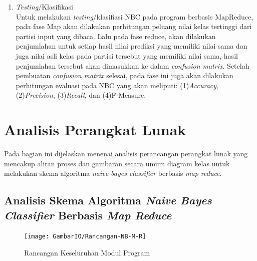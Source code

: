 \begin{enumerate}
	\item \textit{Testing}/Klasifikasi\\
	Untuk melakukan \textit{testing}/klasifiasi NBC pada program berbasis MapReduce, pada fase Map akan dilakukan perhitungan peluang nilai kelas tertinggi dari partisi input yang dibaca. Lalu pada fase reduce, akan dilakukan penjumlahan untuk setiap hasil nilai prediksi yang memiliki nilai sama dan juga nilai asli kelas pada partisi tersebut yang memiliki nilai sama, hasil penjumlahan tersebut akan dimasukkan ke dalam \textit{confusion matrix}. Setelah pembuatan \textit{confusion matrix} selesai, pada fase ini juga akan dilakukan perhitungan evaluasi pada NBC yang akan meliputi: (1)\textit{Accuracy}, (2)\textit{Precision}, (3)\textit{Recall}, dan (4)F-Measure.

\end{enumerate}


\section{Analisis Perangkat Lunak}

	Pada bagian ini dijelaskan menenai analisis perancangan perangkat lunak yang mencakup aliran proses dan gambaran secara umum diagram kelas untuk melakukan skema algoritma \textit{naive bayes classifier} berbasis \textit{map reduce}.

\subsection{Analisis Skema Algoritma \textit{Naive Bayes Classifier} Berbasis \textit{Map Reduce}}

\begin{figure}[ht]
	\centering
	\texttt{[image: GambarIO/Rancangan-NB-M-R]}
	\caption[Rancangan Keseluruhan Modul Program]{Rancangan Keseluruhan Modul Program}
	\label{fig:Rancangan Keseluruhan Modul Program}
\end{figure}

